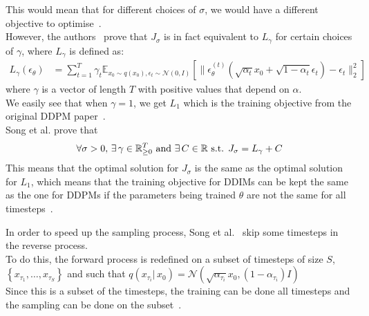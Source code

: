 \documentclass[twoside]{article}
\numberwithin{equation}{section}
\numberwithin{figure}{section}
\begin{document}
This would mean that for different choices of $\sigma$, we would have a different objective to optimise~\cite{song2022denoising}. \\
However, the authors~\cite{song2022denoising} prove that $J_\sigma$ is in fact equivalent to $L_\gamma$ for certain choices of $\gamma$, where $L_\gamma$ is defined as:
\begin{align}
  L_\gamma (\epsilon_\theta) &= \sum_{t=1}^{T} \gamma_t \mathbb{E}_{x_0 \sim q(x_0), \epsilon_t \sim \mathcal{N}(0, I)}  \left[ \| \epsilon_\theta^{(t)} (\sqrt{\alpha_t} x_0 + \sqrt{1 - \alpha_t} \epsilon_t) - \epsilon_t \|_2^2 \right]
\end{align}
where $\gamma$ is a vector of length $T$ with positive values that depend on $\alpha$. \\
We easily see that when $\gamma = 1$, we get $L_1$ which is the training objective from the original DDPM paper~\cite{ho2020denoising, song2022denoising}. \\
Song et al. prove that
\begin{align}
  \forall \sigma > 0, \, \exists \, \gamma \in \mathbb{R}_{\geq 0}^T \text{ and } \exists \, C \in \mathbb{R} \text{ s.t. } J_\sigma = L_\gamma + C \notag
\end{align}
This means that the optimal solution for $J_\sigma$ is the same as the optimal solution for $L_1$, which means that the training objective for DDIMs can be kept the same as the one for DDPMs if the parameters being trained $\theta$ are not the same for all timesteps~\cite{song2022denoising}.

In order to speed up the sampling process, Song et al.~\cite{song2022denoising} skip some timesteps in the reverse process. \\
To do this, the forward process is redefined on a subset of timesteps of size $S$, $\left\{ x_{\tau_1}, \dots, x_{\tau_S} \right\}$ and such that $q(x_{\tau_i} | \, x_0) = \mathcal{N}(\sqrt{\alpha_{\tau_i}} x_0, (1 - \alpha_{\tau_i})I)$ \\
Since this is a subset of the timesteps, the training can be done all timesteps and the sampling can be done on the subset~\cite{song2022denoising}.
\end{document}
